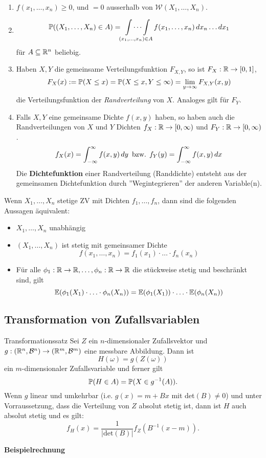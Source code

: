 \begin{enumerate}
    \item $f(x_1, \ldots, x_n) \geq 0$, und $ = 0$ ausserhalb von $\mathcal{W}(X_1, \ldots, X_n)$.
    \item 
    \begin{gather*}
        \P((X_1, \ldots, X_n) \in A) = \idotsint\limits_{(x_1, \ldots, x_n) \in A} f(x_1, \ldots, x_n) \mathop{dx_n}\ldots\mathop{dx_1}
    \end{gather*}
    für $A \subseteq \R^n$ beliebig.
    \item Haben $X, Y$ die gemeinsame Verteilungsfunktion $F_{X,Y}$, so ist $F_X: \R \to [0,1]$,
    $$F_X(x) := \P(X \leq x) = \P(X \leq x, Y \leq \infty) = \lim_{y \to \infty}F_{X,Y}(x,y)$$
    die Verteilungsfunktion der \textit{Randverteilung} von $X$. Analoges gilt für $F_Y$.
    \item Falls $X,Y$ eine gemeinsame Dichte $f(x,y)$ haben, so haben auch die Randverteilungen von $X$ und $Y$ Dichten $f_X: \R \to [0, \infty)$ und $F_Y: \R \to [0, \infty)$.
    $$f_X(x) = \int_{-\infty}^{\infty}f(x,y)\mathop{dy} \text{ bzw. } f_Y(y)=\int_{-\infty}^{\infty}f(x,y)\dx$$
    Die \textbf{Dichtefunktion} einer Randverteilung (Randdichte) entsteht aus der gemeinsamen Dichtefunktion durch ''Wegintegrieren'' der anderen Variable(n).
\end{enumerate}
Wenn $X_1, \ldots, X_n$ stetige ZV mit Dichten $f_1, \ldots, f_n$, dann sind die folgenden Aussagen äquivalent:
\begin{itemize}
    \item $X_1, \ldots, X_n$ unabhängig
    \item $(X_1, \ldots, X_n)$ ist stetig mit gemeinsamer Dichte $$f(x_1, \ldots, x_n) = f_1(x_1) \cdot \ldots \cdot f_n(x_n)$$
    \item Für alle $\phi_1: \R \to \R, \ldots, \phi_n: \R \to \R$ die stückweise stetig und beschränkt sind, gilt 
    $$\E(\phi_1(X_1)\cdot \ldots \cdot \phi_n(X_n)) = \E(\phi_1(X_1)) \cdot \ldots \cdot \E(\phi_n(X_n))$$
\end{itemize}
\subsection{Transformation von Zufallsvariablen}
\begin{subbox}{Transformationssatz}
    Sei $Z$ ein $n$-dimensionaler Zufallsvektor und $g: (\R^n, \mathcal{B}^n) \to (\R^m, \mathcal{B}^m)$ eine messbare Abbildung. Dann ist
    $$H(\omega) = g(Z(\omega))$$
    ein $m$-dimensionaler Zufallsvariable und ferner gilt
    $$\P(H \in A) = \P(X \in g^{-1}(A)).$$
    Wenn $g$ linear und umkehrbar (i.e. $g(x) = m + Bx$ mit det$(B) \neq 0$) und unter Vorraussetzung, dass die Verteilung von $Z$ absolut stetig ist, dann ist $H$ auch absolut stetig und es gilt:
    $$f_H(x)=\frac{1}{|\text{det}(B)|}f_Z(B^{-1}(x-m)).$$
\end{subbox}
\textbf{Beispielrechnung}

